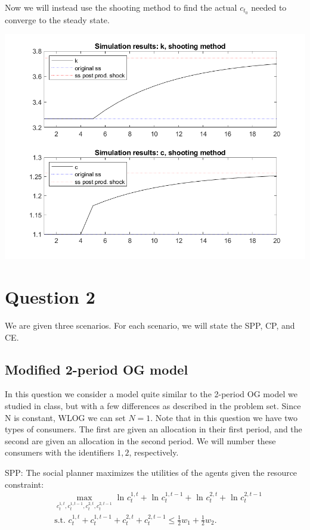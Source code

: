 \documentclass[11pt]{article} %
\begin{document}
Now we will instead use the shooting method to find the actual $c_{t_0}$ needed to converge to the steady state.

\includegraphics{sh}

\section{Question 2}

We are given three scenarios. For each scenario, we will state the SPP, CP, and CE.

\subsection{Modified 2-period OG model}
In this question we consider a model quite similar to the 2-period OG model we studied in class, but with a few differences as described in the problem set. Since N is constant, WLOG we can set $N=1$. Note that in this question we have two types of consumers. The first are given an allocation in their first period, and the second are given an allocation in the second period. We will number these consumers with the identifiers $1,2$, respectively.

SPP: The social planner maximizes the utilities of the agents given the resource constraint:
\begin{align*} 
&\max_{c_t^{1,t},c_{t}^{1,t-1},c_t^{2,t},c_{t}^{2,t-1}} \text{ ln } c_{t}^{1,t} + \text{ ln } c_{t}^{1,t-1} + \text{ ln } c_{t}^{2,t} + \text{ ln } c_{t}^{2,t-1}\\
&\text{s.t. }  c_{t}^{1,t} +  c_{t}^{1,t-1} + c_{t}^{2,t} +  c_{t}^{2,t-1} \leq \frac{1}{2}w_1 + \frac{1}{2} w_2.
\end{align*}
\end{document}
